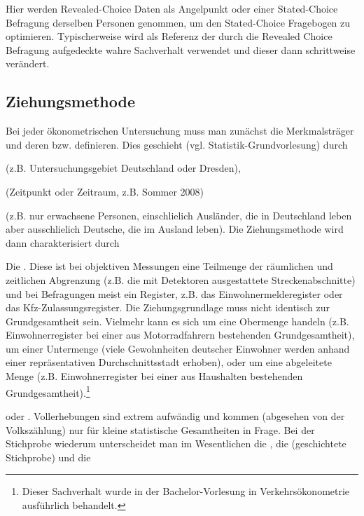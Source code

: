 \item {}
Hier werden Revealed-Choice Daten als Angelpunkt oder
 einer Stated-Choice Befragung derselben Personen
genommen, um den Stated-Choice Fragebogen zu
optimieren. Typischerweise wird als Referenz der durch die Revealed
Choice Befragung aufgedeckte wahre Sachverhalt verwendet und dieser
dann schrittweise ver\"andert.
\ei

\subsection{Ziehungsmethode} 

Bei jeder \"okonometrischen
Untersuchung muss man zun\"achst die Merkmalstr\"ager und deren 
bzw. 
definieren. Dies geschieht (vgl. Statistik-Grundvorlesung) durch 
\bi
\item {} (z.B. Untersuchungsgebiet
Deutschland oder Dresden),
\item {} (Zeitpunkt oder Zeitraum,
z.B. Sommer 2008)
\item {} (z.B. nur erwachsene Personen,
einschlie\3lich Ausl\"ander, die in Deutschland leben aber
ausschlie\3lich Deutsche, die im Ausland leben).
\ei
Die Ziehungsmethode wird dann charakterisiert durch 
\bi
\item Die . Diese ist bei objektiven Messungen eine
Teilmenge der r\"aumlichen und zeitlichen Abgrenzung (z.B. die mit
Detektoren ausgestattete Streckenabschnitte) und bei Befragungen meist ein Register, z.B. das
Einwohnermelderegister oder das Kfz-Zulassungsregister. Die
Ziehungsgrundlage muss nicht identisch zur
Grund\-gesamtheit sein. Vielmehr kann es sich um eine Obermenge handeln
(z.B. Einwohnerregister bei einer aus Motorradfahrern bestehenden
Grund\-gesamtheit), um einer Untermenge (viele Gewohnheiten 
deutscher Einwohner werden anhand einer repr\"asentativen
Durchschnittsstadt erhoben), oder um eine ab\-ge\-lei\-te\-te Menge
(z.B. Einwohnerregister bei einer aus Haushalten bestehenden
Grund\-gesamtheit).\footnote{Dieser Sachverhalt wurde in der Bachelor-Vorlesung
in Verkehrs\"okonometrie 
ausf\"uhrlich behandelt.}
\item 
{} oder . Vollerhebungen sind extrem aufw\"andig
und kommen (abgesehen von der Volksz\"ahlung) nur f\"ur kleine
statistische Gesamtheiten in Frage. Bei der Stichprobe wiederum
unterscheidet man im Wesentlichen die , die
 (geschichtete Stichprobe)  und die 
\ei

